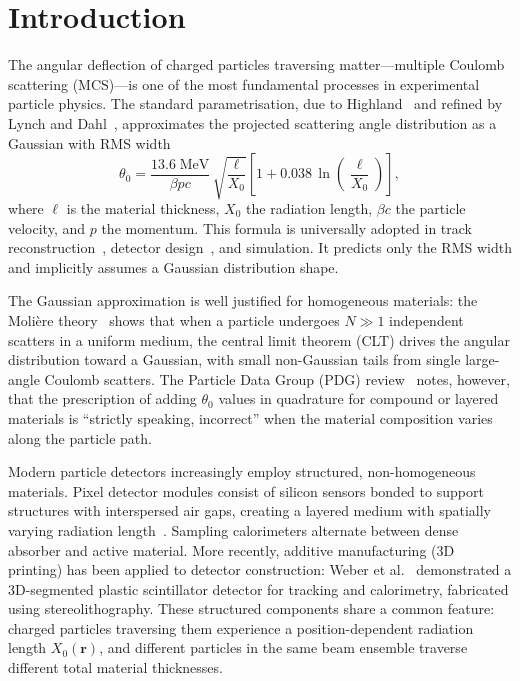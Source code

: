 \documentclass[final,5p,times,twocolumn]{elsarticle}
\begin{document}
\section{Introduction}
\label{sec:intro}

The angular deflection of charged particles traversing matter---multiple Coulomb scattering (MCS)---is one of the most fundamental processes in experimental particle physics.  The standard parametrisation, due to Highland~\cite{Highland1975,Highland1979} and refined by Lynch and Dahl~\cite{Lynch1991}, approximates the projected scattering angle distribution as a Gaussian with RMS width
\begin{equation}
  \theta_0 = \frac{13.6\;\text{MeV}}{\beta p c}\,\sqrt{\frac{\ell}{X_0}}\left[1 + 0.038\,\ln\!\left(\frac{\ell}{X_0}\right)\right],
  \label{eq:highland}
\end{equation}
where $\ell$ is the material thickness, $X_0$ the radiation length, $\beta c$ the particle velocity, and $p$ the momentum.  This formula is universally adopted in track reconstruction~\cite{Fruhwirth1987,FruhwirthStrandlie2021}, detector design~\cite{PDG2024}, and simulation.  It predicts only the RMS width and implicitly assumes a Gaussian distribution shape.

The Gaussian approximation is well justified for homogeneous materials: the Moli\`{e}re theory~\cite{Moliere1947,Moliere1948,Bethe1953} shows that when a particle undergoes $N\gg 1$ independent scatters in a uniform medium, the central limit theorem (CLT) drives the angular distribution toward a Gaussian, with small non-Gaussian tails from single large-angle Coulomb scatters.  The Particle Data Group (PDG) review~\cite{PDG2024} notes, however, that the prescription of adding $\theta_0$ values in quadrature for compound or layered materials is ``strictly speaking, incorrect'' when the material composition varies along the particle path.

Modern particle detectors increasingly employ structured, non-homogeneous materials.  Pixel detector modules consist of silicon sensors bonded to support structures with interspersed air gaps, creating a layered medium with spatially varying radiation length~\cite{ATLASPixelTDR,ATLASStripTDR}.  Sampling calorimeters alternate between dense absorber and active material.  More recently, additive manufacturing (3D printing) has been applied to detector construction: Weber et al.~\cite{Weber2025} demonstrated a 3D-segmented plastic scintillator detector for tracking and calorimetry, fabricated using stereolithography.  These structured components share a common feature: charged particles traversing them experience a position-dependent radiation length $X_0(\mathbf{r})$, and different particles in the same beam ensemble traverse different total material thicknesses.
\end{document}

